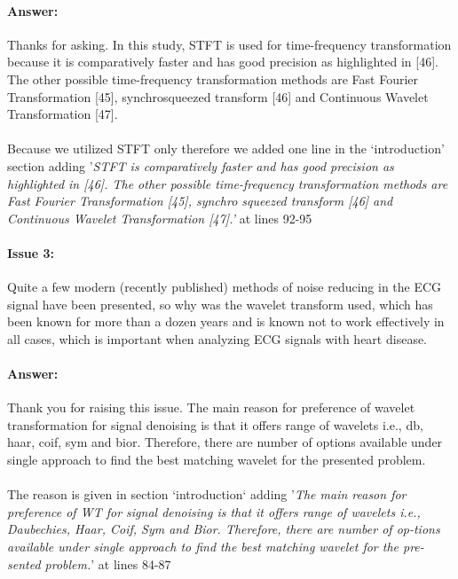 \documentclass{article}
\begin{document}
\paragraph{Answer:}
Thanks for asking. In this study, STFT is used for time-frequency transformation because it is comparatively faster and has good precision as highlighted in [46]. The other possible time-frequency transformation methods are Fast Fourier Transformation [45], synchrosqueezed transform [46] and  Continuous Wavelet Transformation [47]. \\\\
‌
Because we utilized STFT only therefore we added one line in the `introduction' section adding '\textit{STFT is comparatively faster and has good precision as highlighted in [46]. The other possible time-frequency transformation methods are Fast Fourier Transformation [45], synchro squeezed transform [46] and Continuous Wavelet Transformation [47].'} at lines 92-95

\paragraph{Issue 3:}
\begin{displayquote}
Quite a few modern (recently published) methods of noise reducing in the ECG signal have been presented, so why was the wavelet transform used, which has been known for more than a dozen years and is known not to work effectively in all cases, which is important when analyzing ECG signals with heart disease.
\end{displayquote}

\paragraph{Answer:}
Thank you for raising this issue. The main reason for preference of wavelet transformation for signal denoising is that it offers range of wavelets i.e., db, haar, coif, sym and bior. Therefore, there are number of options available under single approach to find the best matching wavelet for the presented problem. \\\\

The reason is given in section `introduction` adding '\textit{The main reason for preference of WT for signal denoising is that it offers range of wavelets i.e., Daubechies, Haar, Coif, Sym and Bior. Therefore, there are number of op-tions available under single approach to find the best matching wavelet for the pre-sented problem.}' at lines 84-87
\end{document}
